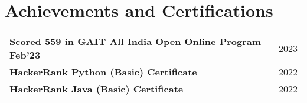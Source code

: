 \documentclass[a4paper,12pt]{article}
\begin{document}
\section{Achievements and Certifications}
\begin{tabularx}{\linewidth}{ @{}l r@{} }
\textbf{Scored 559 in GAIT All India Open Online Program Feb'23} & \hfill \hspace{5.2cm}2023 \\[3.75pt]
\textbf{HackerRank Python (Basic) Certificate} & \hfill \hspace{5.2cm}2022 \\[3.75pt]
\textbf{HackerRank Java (Basic) Certificate} & \hfill \hspace{5.2cm}2022 \\[3.75pt]
\end{tabularx}

\end{document}
